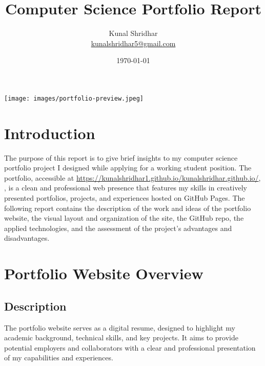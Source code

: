 \documentclass{article}
\begin{document}
\title{Computer Science Portfolio Report}
\author{Kunal Shridhar \\ \href{mailto:kunalshridhar5@gmail.com}{kunalshridhar5@gmail.com}}
\date{\today}
\maketitle
\begin{center}
    \texttt{[image: images/portfolio-preview.jpeg]}
\end{center}
\newpage

\tableofcontents
\newpage

\section{Introduction}
The purpose of this report is to give brief insights to my computer science portfolio project I designed while applying for a working student position. The portfolio, accessible at \url{https://kunalshridhar1.github.io/kunalshridhar.github.io/}, , is a clean and professional web presence that features my skills in creatively presented portfolios, projects, and experiences hosted on GitHub Pages. The following report contains the description of the work and ideas of the portfolio website, the visual layout and organization of the site, the GitHub repo, the applied technologies, and the assessment of the project’s advantages and disadvantages.

\section{Portfolio Website Overview}
\subsection{Description}
The portfolio website serves as a digital resume, designed to highlight my academic background, technical skills, and key projects. It aims to provide potential employers and collaborators with a clear and professional presentation of my capabilities and experiences.
\end{document}
